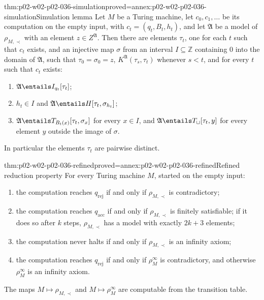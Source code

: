 \begin{hblemma}{thm:p02-w02-p02-036-simulation}{proved=annex:p02-w02-p02-036-simulation}{Simulation lemma}
Let \(M\) be a Turing machine, let \(c_0,c_1,\ldots\) be its computation on
the empty input, with \(c_t=(q_t,B_t,h_t)\), and let \(\mathfrak A\) be a
model of \(\rho_{M,\prec}\) with an element \(z\in Z^{\mathfrak A}\).  Then there
are elements \(\tau_t\), one for each \(t\) such that \(c_t\) exists, and an
injective map \(\sigma\) from an interval \(I\subseteq\mathbb Z\) containing
\(0\) into the domain of \(\mathfrak A\), such that \(\tau_0=\sigma_0=z\),
\(K^{\mathfrak A}(\tau_s,\tau_t)\) whenever \(s<t\), and for every \(t\) such
that \(c_t\) exists:
\begin{enumerate}
\item \(\mathfrak A\entails I_{q_t}[\tau_t]\);
\item \(h_t\in I\) and \(\mathfrak A\entails H[\tau_t,\sigma_{h_t}]\);
\item \(\mathfrak A\entails T_{B_t(x)}[\tau_t,\sigma_x]\) for every \(x\in I\),
      and \(\mathfrak A\entails T_{\sqcup}[\tau_t,y]\) for every element \(y\)
      outside the image of \(\sigma\).
\end{enumerate}
In particular the elements \(\tau_t\) are pairwise distinct.
\end{hblemma}

\begin{hbtheorem}{thm:p02-w02-p02-036-refined}{proved=annex:p02-w02-p02-036-refined}{Refined reduction property}
For every Turing machine \(M\), started on the empty input:
\begin{enumerate}
\item the computation reaches \(q_{\mathrm{rej}}\) if and only if
      \(\rho_{M,\prec}\) is contradictory;
\item the computation reaches \(q_{\mathrm{acc}}\) if and only if
      \(\rho_{M,\prec}\) is finitely satisfiable; if it does so after \(k\)
      steps, \(\rho_{M,\prec}\) has a model with exactly \(2k+3\) elements;
\item the computation never halts if and only if \(\rho_{M,\prec}\) is an
      infinity axiom;
\item the computation reaches \(q_{\mathrm{rej}}\) if and only if
      \(\rho^{\infty}_{M}\) is contradictory, and otherwise
      \(\rho^{\infty}_{M}\) is an infinity axiom.
\end{enumerate}
The maps \(M\mapsto\rho_{M,\prec}\) and \(M\mapsto\rho^{\infty}_{M}\) are
computable from the transition table.
\end{hbtheorem}

